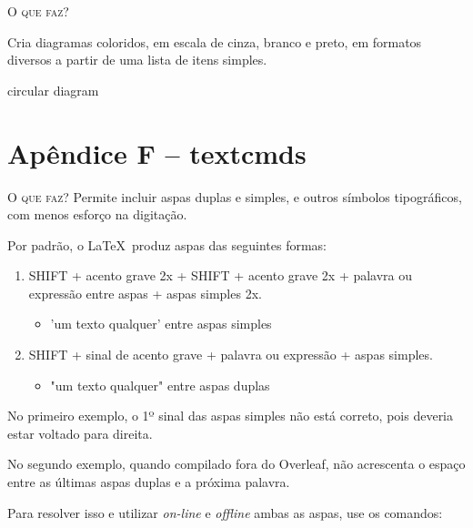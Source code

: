 \noindent\textsc{O que faz?}

Cria diagramas coloridos, em escala de cinza, branco e preto, em formatos diversos a partir de uma lista de itens simples.

\begin{codex}{circular diagram}
\begin{center}
\end{center}	
\end{codex}

\begin{center}
\end{center}

\chapter*{Apêndice F -- textcmds}

\noindent\textsc{O que faz?}
Permite incluir aspas duplas e simples, e outros símbolos tipográficos, com menos esforço na digitação.

Por padrão, o \LaTeX\ produz aspas das seguintes formas:
\begin{enumerate}
	\item SHIFT + acento grave 2x + SHIFT + acento grave 2x + palavra ou expressão entre aspas + aspas simples 2x.
            \begin{itemize}
                \item 'um texto qualquer' entre aspas simples
            \end{itemize}
	\item SHIFT + sinal de acento grave + palavra ou expressão + aspas simples.
            \begin{itemize}
                \item "um texto qualquer" entre aspas duplas
            \end{itemize}
\end{enumerate}

No primeiro exemplo, o 1º sinal das aspas simples não está correto, pois deveria estar voltado para direita.

No segundo exemplo, quando compilado fora do Overleaf, não acrescenta o espaço entre as últimas aspas duplas e a próxima palavra.

Para resolver isso e utilizar \textit{on-line} e \textit{offline} ambas as aspas, use os comandos:

